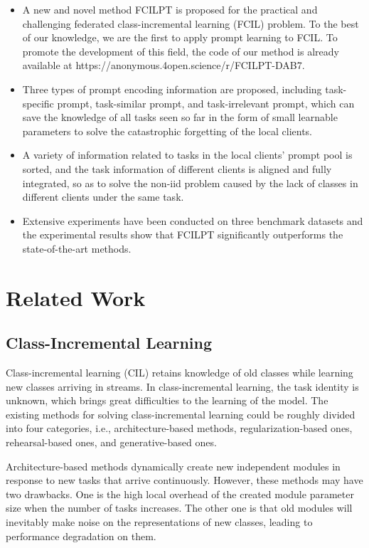 \documentclass[sigconf,anonymous,review,screen]{acmart}
\begin{document}
\begin{itemize}
\item A new and novel method FCILPT is proposed for the practical and challenging federated class-incremental learning (FCIL) problem. To the best of our knowledge, we are the first to apply prompt learning to FCIL.  To promote the development of this field, the code of our method is already available at https://anonymous.4open.science/r/FCILPT-DAB7.
\item Three types of prompt encoding information are proposed, including task-specific prompt, task-similar prompt, and task-irrelevant prompt, which can save the knowledge of all tasks seen so far in the form of small learnable parameters to solve the catastrophic forgetting of the local clients.
\item A variety of information related to tasks in the local clients' prompt pool is sorted, and the task information of different clients is aligned and fully integrated, so as to solve the non-iid problem caused by the lack of classes in different clients under the same task.
\item Extensive experiments have been conducted on three benchmark datasets and the experimental results show that FCILPT significantly outperforms the state-of-the-art methods.
\end{itemize}

\section{Related Work}

\subsection{Class-Incremental Learning}
Class-incremental learning (CIL) retains knowledge of old classes while learning new classes arriving in streams. In class-incremental learning, the task identity is unknown, which brings great difficulties to the learning of the model. The existing methods for solving class-incremental learning could be roughly divided into four categories, i.e., architecture-based methods, regularization-based ones, rehearsal-based ones, and generative-based ones.

Architecture-based methods \cite{fernando2017pathnet,golkar2019continual,hung2019compacting,rusu2016progressive,aljundi2019gradient} dynamically create new independent modules in response to new tasks that arrive continuously. However, these methods may have two  drawbacks. One is the high local overhead of the created module parameter size when the number of tasks increases. The other one is that old modules will inevitably make noise on the representations of new classes, leading to performance degradation on them.
\end{document}
